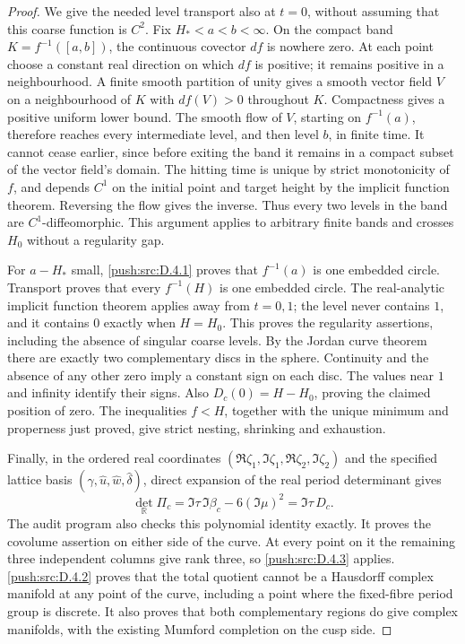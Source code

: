 \begin{proof}
We give the needed level transport also at \(t=0\), without
assuming that this coarse function is \(C^2\). Fix
\(H_*<a<b<\infty\). On the compact band
\(K=f^{-1}([a,b])\), the continuous covector \(df\) is nowhere
zero. At each point choose a constant real direction on which
\(df\) is positive; it remains positive in a neighbourhood.
A finite smooth partition of unity gives a smooth vector field
\(V\) on a neighbourhood of \(K\) with \(df(V)>0\) throughout
\(K\). Compactness gives a positive uniform lower bound. The
smooth flow of \(V\), starting on \(f^{-1}(a)\), therefore reaches
every intermediate level, and then level \(b\), in finite time.
It cannot cease earlier, since before exiting the band it remains
in a compact subset of the vector field's domain. The hitting time
is unique by strict monotonicity of \(f\), and depends \(C^1\) on
the initial point and target height by the implicit function theorem.
Reversing the flow gives the inverse. Thus every two levels in the
band are \(C^1\)-diffeomorphic. This argument applies to arbitrary
finite bands and crosses \(H_0\) without a regularity gap.

For \(a-H_*\) small, \ref{push:src:D.4.1} proves that \(f^{-1}(a)\) is one
embedded circle. Transport proves that every \(f^{-1}(H)\) is
one embedded circle. The real-analytic implicit function theorem
applies away from \(t=0,1\); the level never contains \(1\),
and it contains \(0\) exactly when \(H=H_0\). This proves the
regularity assertions, including the absence of singular coarse
levels. By the Jordan curve theorem there are exactly two
complementary discs in the sphere. Continuity and the absence of
any other zero imply a constant sign on each disc. The values near
\(1\) and infinity identify their signs. Also
\(D_c(0)=H-H_0\), proving the claimed position of zero. The
inequalities \(f<H\), together with the unique minimum and
properness just proved, give strict nesting, shrinking and
exhaustion.

Finally, in the ordered real coordinates
\((\Re\zeta_1,\Im\zeta_1,\Re\zeta_2,\Im\zeta_2)\) and the
specified lattice basis \((\widehat\gamma,\widehat u,
\widehat w,\widehat\delta)\), direct expansion of the real
period determinant gives
\[
 \det_{\mathbb R}\Pi_c
 =\Im\tau\,\Im\beta_c-6(\Im\mu)^2
 =\Im\tau\,D_c.
\]
The audit program also checks this polynomial identity exactly.
It proves the covolume assertion on either side of the curve. At
every point on it the remaining three independent columns give
rank three, so \ref{push:src:D.4.3} applies. \ref{push:src:D.4.2} proves that the total quotient
cannot be a Hausdorff complex manifold at any point of the curve,
including a point where the fixed-fibre period group is discrete.
It also proves that both complementary regions do give complex
manifolds, with the existing Mumford completion on the cusp side.


\end{proof}

